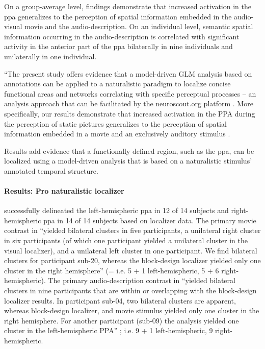 On a group-average level, findings demonstrate that increased activation in the
\ac{ppa} generalizes to the perception of spatial information embedded in the
audio-visual movie and the audio-description.
On an individual level, semantic spatial information occurring in the
audio-description is correlated with significant activity in the anterior part
of the \ac{ppa} bilaterally in nine individuals and unilaterally in one
individual.

``The present study offers evidence that a model-driven GLM analysis based on
annotations can be applied to a naturalistic paradigm to localize concise
functional areas and networks correlating with specific perceptual processes --
an analysis approach that can be facilitated by the neuroscout.org platform
\citep{delavega2021neuroscout}.
More specifically, our results demonstrate that increased activation in the PPA
during the perception of static pictures generalizes to the perception of
spatial information embedded in a movie and an exclusively auditory stimulus
\citep{haeusler2022processing}.

Results add evidence \citep[cf.][]{bartels2004mapping} that a functionally
defined region, such as the \ac{ppa}, can be localized using a model-driven
analysis that is based on a naturalistic stimulus' annotated temporal structure.


\paragraph{Results: Pro naturalistic localizer}


\citet{sengupta2016extension} successfully delineated the left-hemispheric
\ac{ppa} in 12 of 14 subjects and right-hemispheric \ac{ppa} in 14 of 14
subjects based on localizer data.
%
The primary movie contrast in \citet{haeusler2022processing} ``yielded bilateral
clusters in five participants, a unilateral right cluster in six participants
(of which one participant yielded a unilateral cluster in the visual localizer),
and a unilateral left cluster in one participant.
%
We find bilateral clusters for participant sub-20, whereas the block-design
localizer yielded only one cluster in the right hemisphere''
\citep{haeusler2022processing} (= i.e. 5 + 1 left-hemispheric, 5 + 6
right-hemispheric).
%
The primary audio-description contrast in \citet{haeusler2022processing}
``yielded bilateral clusters in nine participants that are within or overlapping
with the block-design localizer results.
%
In participant sub-04, two bilateral clusters are apparent, whereas block-design
localizer, and movie stimulus yielded only one cluster in the right hemisphere.
%
For another participant (sub-09) the analysis yielded one cluster in the
left-hemispheric PPA'' \citep{haeusler2022processing}; i.e. 9 + 1
left-hemispheric, 9 right-hemispheric.


